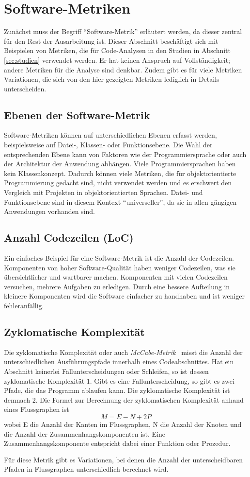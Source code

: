 \section{Software-Metriken}
\label{sec:metriken}
Zunächst muss der Begriff "`Software-Metrik"' erläutert werden, da dieser zentral für den Rest der Ausarbeitung ist.
Dieser Abschnitt beschäftigt sich mit Beispielen von Metriken, die für Code-Analysen in den Studien in Abschnitt \ref{sec:studien} verwendet werden.
Er hat keinen Anspruch auf Vollständigkeit; andere Metriken für die Analyse sind denkbar.
Zudem gibt es für viele Metriken Variationen, die sich von den hier gezeigten Metriken lediglich in Details unterscheiden.

\subsection{Ebenen der Software-Metrik}
Software-Metriken können auf unterschiedlichen Ebenen erfasst werden, beispielsweise auf Datei-, Klassen- oder Funktionsebene.
Die Wahl der entsprechenden Ebene kann von Faktoren wie der Programmiersprache oder auch der Architektur der Anwendung abhängen.
Viele Programmiersprachen haben kein Klassenkonzept.
Dadurch können viele Metriken, die für objektorientierte Programmierung gedacht sind, nicht verwendet werden und es erschwert den Vergleich mit Projekten in objektorientierten Sprachen.
Datei- und Funktionsebene sind in diesem Kontext "`universeller"', da sie in allen gängigen Anwendungen vorhanden sind.

\subsection{Anzahl Codezeilen (LoC)}
Ein einfaches Beispiel für eine Software-Metrik ist die Anzahl der Codezeilen.
Komponenten von hoher Software-Qualität haben weniger Codezeilen, was sie übersichtlicher und wartbarer machen.
Komponenten mit vielen Codezeilen versuchen, mehrere Aufgaben zu erledigen.
Durch eine bessere Aufteilung in kleinere Komponenten wird die Software einfacher zu handhaben und ist weniger fehleranfällig.

\subsection{Zyklomatische Komplexität}
Die zyklomatische Komplexität oder auch \emph{McCabe-Metrik}~\cite{mccabe1976} misst die Anzahl der unterschiedlichen Ausführungspfade innerhalb eines Codeabschnittes.
Hat ein Abschnitt keinerlei Fallunterscheidungen oder Schleifen, so ist dessen zyklomatische Komplexität 1.
Gibt es eine Fallunterscheidung, so gibt es zwei Pfade, die das Programm ablaufen kann.
Die zyklomatische Komplexität ist demnach 2.
Die Formel zur Berechnung der zyklomatischen Komplexität anhand eines Flussgraphen ist
\begin{equation}
	M = E - N + 2P
\end{equation}
wobei E die Anzahl der Kanten im Flussgraphen, N die Anzahl der Knoten und die Anzahl der Zusammenhangskomponenten ist.
Eine Zusammenhangskomponente entspricht dabei einer Funktion oder Prozedur.

Für diese Metrik gibt es Variationen, bei denen die Anzahl der unterscheidbaren Pfaden in Flussgraphen unterschiedlich berechnet wird.
